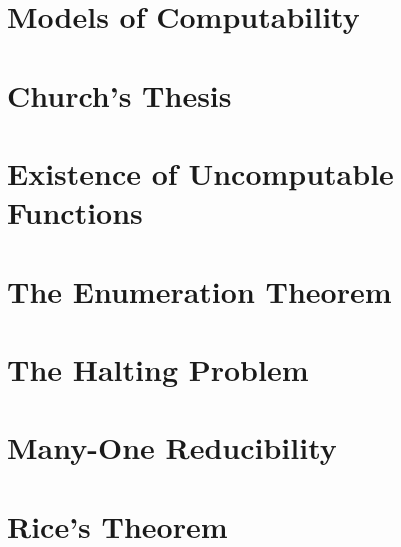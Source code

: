 \section{Models of Computability}
\section{Church's Thesis}
\section{Existence of Uncomputable Functions}
\section{The Enumeration Theorem}
\section{The Halting Problem}
\section{Many-One Reducibility}
\section{Rice's Theorem}
